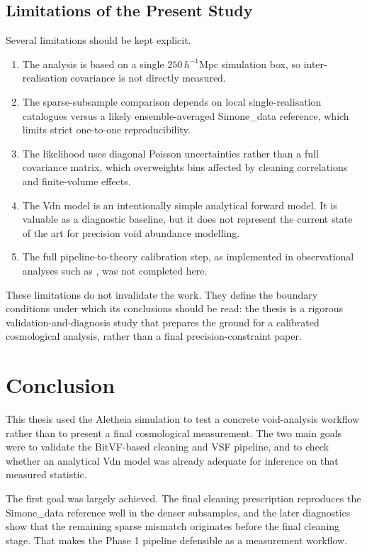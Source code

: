 \documentclass[12pt]{report}
\begin{document}
\section{Limitations of the Present Study}

Several limitations should be kept explicit.

\begin{enumerate}
    \item The analysis is based on a single $250\,h^{-1}\mathrm{Mpc}$ simulation box, so inter-realisation covariance is not directly measured.
    \item The sparse-subsample comparison depends on local single-realisation catalogues versus a likely ensemble-averaged Simone\_data reference, which limits strict one-to-one reproducibility.
    \item The likelihood uses diagonal Poisson uncertainties rather than a full covariance matrix, which overweights bins affected by cleaning correlations and finite-volume effects.
    \item The Vdn model is an intentionally simple analytical forward model. It is valuable as a diagnostic baseline, but it does not represent the current state of the art for precision void abundance modelling.
    \item The full pipeline-to-theory calibration step, as implemented in observational analyses such as \citet{Contarini2023}, was not completed here.
\end{enumerate}

These limitations do not invalidate the work. They define the boundary conditions under which its conclusions should be read: the thesis is a rigorous validation-and-diagnosis study that prepares the ground for a calibrated cosmological analysis, rather than a final precision-constraint paper.

\chapter{Conclusion}
\label{chap:conclusion}

This thesis used the Aletheia simulation to test a concrete void-analysis workflow rather than to present a final cosmological measurement. The two main goals were to validate the BitVF-based cleaning and VSF pipeline, and to check whether an analytical Vdn model was already adequate for inference on that measured statistic.

The first goal was largely achieved. The final cleaning prescription reproduces the Simone\_data reference well in the denser subsamples, and the later diagnostics show that the remaining sparse mismatch originates before the final cleaning stage. That makes the Phase 1 pipeline defensible as a measurement workflow.
\end{document}
